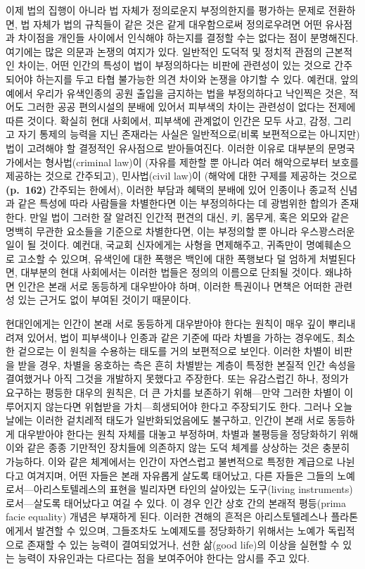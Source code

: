 이제 법의 집행이 아니라 법 자체가 정의로운지 부정의한지를 평가하는
문제로 전환하면, 법 자체가 법의 규칙들이 같은 것은 같게 대우함으로써
정의로우려면 어떤 유사점과 차이점을 개인들 사이에서 인식해야 하는지를
결정할 수는 없다는 점이 분명해진다. 여기에는 많은 의문과 논쟁의 여지가
있다. 일반적인 도덕적 및 정치적 관점의 근본적인 차이는, 어떤 인간의
특성이 법이 부정의하다는 비판에 관련성이 있는 것으로 간주되어야 하는지를
두고 타협 불가능한 의견 차이와 논쟁을 야기할 수 있다. 예컨대, 앞의
예에서 우리가 유색인종의 공원 출입을 금지하는 법을 부정의하다고 낙인찍은
것은, 적어도 그러한 공공 편의시설의 분배에 있어서 피부색의 차이는
관련성이 없다는 전제에 따른 것이다. 확실히 현대 사회에서, 피부색에
관계없이 인간은 모두 사고, 감정, 그리고 자기 통제의 능력을 지닌 존재라는
사실은 일반적으로(비록 보편적으로는 아니지만) 법이 고려해야 할 결정적인
유사점으로 받아들여진다. 이러한 이유로 대부분의 문명국가에서는
형사법(criminal law)이 (자유를 제한할 뿐 아니라 여러 해악으로부터 보호를
제공하는 것으로 간주되고), 민사법(civil law)이 (해악에 대한 구제를
제공하는 것으로 \textbf{(p.~162)} 간주되는 한에서), 이러한 부담과 혜택의
분배에 있어 인종이나 종교적 신념과 같은 특성에 따라 사람들을 차별한다면
이는 부정의하다는 데 광범위한 합의가 존재한다. 만일 법이 그러한 잘
알려진 인간적 편견의  대신, 키, 몸무게, 혹은 외모와
같은 명백히 무관한 요소들을 기준으로 차별한다면, 이는 부정의할 뿐 아니라
우스꽝스러운 일이 될 것이다. 예컨대, 국교회 신자에게는 사형을
면제해주고, 귀족만이 명예훼손으로 고소할 수 있으며, 유색인에 대한 폭행은
백인에 대한 폭행보다 덜 엄하게 처벌된다면, 대부분의 현대 사회에서는
이러한 법들은 정의의 이름으로 단죄될 것이다. 왜냐하면 인간은 본래 서로
동등하게 대우받아야 하며, 이러한 특권이나 면책은 어떠한 관련성 있는
근거도 없이 부여된 것이기 때문이다.

현대인에게는 인간이 본래 서로 동등하게 대우받아야 한다는 원칙이 매우
깊이 뿌리내려져 있어서, 법이 피부색이나 인종과 같은 기준에 따라 차별을
가하는 경우에도, 최소한 겉으로는 이 원칙을 수용하는 태도를 거의
보편적으로 보인다. 이러한 차별이 비판을 받을 경우, 차별을 옹호하는 측은
흔히 차별받는 계층이 특정한 본질적 인간 속성을 결여했거나 아직 그것을
개발하지 못했다고 주장한다. 또는 유감스럽긴 하나, 정의가 요구하는 평등한
대우의 원칙은, 더 큰 가치를 보존하기 위해---만약 그러한 차별이
이루어지지 않는다면 위협받을 가치---희생되어야 한다고 주장되기도 한다.
그러나 오늘날에는 이러한 겉치레적 태도가 일반화되었음에도 불구하고,
인간이 본래 서로 동등하게 대우받아야 한다는 원칙 자체를 대놓고 부정하며,
차별과 불평등을 정당화하기 위해 이와 같은 종종 기만적인 장치들에
의존하지 않는 도덕 체계를 상상하는 것은 충분히 가능하다. 이와 같은
체계에서는 인간이 자연스럽고 불변적으로 특정한 계급으로 나뉜다고
여겨지며, 어떤 자들은 본래 자유롭게 살도록 태어났고, 다른 자들은 그들의
노예로서---아리스토텔레스의 표현을 빌리자면 타인의 살아있는 도구(living
instruments)로서---살도록 태어났다고 여길 수 있다. 이 경우 인간 상호
간의 본래적 평등(prima facie equality) 개념은 부재하게 된다. 이러한
견해의 흔적은 아리스토텔레스나 플라톤에게서 발견할 수 있으며, 그들조차도
노예제도를 정당화하기 위해서는 노예가 독립적으로 존재할 수 있는 능력이
결여되었거나, 선한 삶(good life)의 이상을 실현할 수 있는 능력이
자유인과는 다르다는 점을 보여주어야 한다는 암시를 주고 있다.

